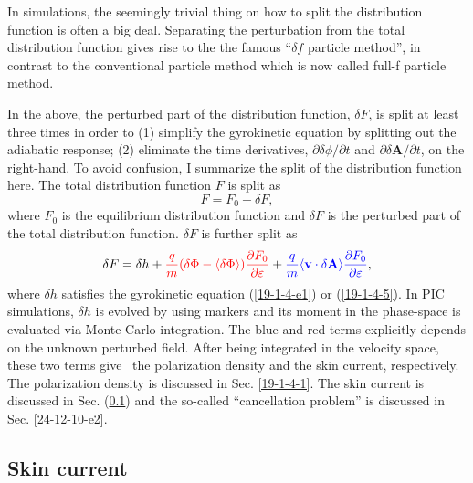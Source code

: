 \documentclass{llncs}
\newcommand{\tmcolor}[2]{{\color{#1}{#2}}}
\begin{document}
In simulations, the seemingly trivial thing on how to split the distribution
function is often a big deal. Separating the perturbation from the total
distribution function gives rise to the the famous ``$\delta f$ particle
method'', in contrast to the conventional particle method which is now called
full-f particle method.

In the above, the perturbed part of the distribution function, $\delta F$, is
split at least three times in order to (1) simplify the gyrokinetic equation
by splitting out the adiabatic response; (2) eliminate the time derivatives,
$\partial \delta \phi / \partial t$ and $\partial \delta \mathbf{A}/ \partial
t$, on the right-hand. To avoid confusion, I summarize the split of the
distribution function here. The total distribution function $F$ is split as
\begin{equation}
  \label{19-1-4-6} F = F_0 + \delta F,
\end{equation}
where $F_0$ is the equilibrium distribution function and $\delta F$ is the
perturbed part of the total distribution function. $\delta F$ is further split
as
\begin{equation}
  \label{19-1-3-e2} \delta F = \delta h + \tmcolor{red}{\frac{q}{m} (\delta
  \Phi - \langle \delta \Phi \rangle) \frac{\partial F_0}{\partial
  \varepsilon}} + \tmcolor{blue}{\frac{q}{m} \langle \mathbf{v} \cdot \delta
  \mathbf{A} \rangle \frac{\partial F_0}{\partial \varepsilon}},
\end{equation}
where $\delta h$ satisfies the gyrokinetic equation (\ref{19-1-4-e1}) or
(\ref{19-1-4-5}). In PIC simulations, $\delta h$ is evolved by using markers
and its moment in the phase-space is evaluated via Monte-Carlo integration.
The blue and red terms explicitly depends on the unknown perturbed field.
After being integrated in the velocity space, these two terms give \ the
polarization density and the skin current, respectively. The polarization
density is discussed in Sec. \ref{19-1-4-1}. The skin current is discussed in
Sec. (\ref{24-12-10-e1}) and the so-called ``cancellation problem'' is
discussed in Sec. \ref{24-12-10-e2}.

\subsection{Skin current}\label{24-12-10-e1}\label{19-3-21-8}
\end{document}
